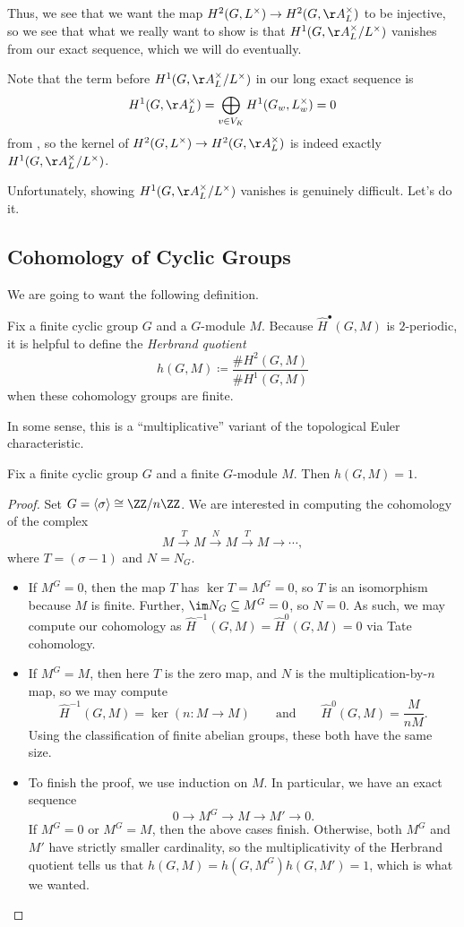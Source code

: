 \documentclass[../notes.tex]{subfiles}
\begin{document}
Thus, we see that we want the map $H^2(G,L^\times)\to H^2(G,\AA_L^\times)$ to be injective, so we see that what we really want to show is that $H^1(G,\AA_L^\times/L^\times)$ vanishes from our exact sequence, which we will do eventually.
\begin{remark}
	Note that the term before $H^1(G,\AA_L^\times/L^\times)$ in our long exact sequence is
	\[H^1(G,\AA_L^\times)=\bigoplus_{v\in V_K}H^1(G_w,L_w^\times)=0\]
	from , so the kernel of $H^2(G,L^\times)\to H^2(G,\AA_L^\times)$ is indeed exactly $H^1(G,\AA_L^\times/L^\times)$.
\end{remark}
Unfortunately, showing $H^1(G,\AA_L^\times/L^\times)$ vanishes is genuinely difficult. Let's do it.

\subsection{Cohomology of Cyclic Groups}
We are going to want the following definition.
\begin{definition}
	Fix a finite cyclic group $G$ and a $G$-module $M$. Because $\widehat H^\bullet(G,M)$ is $2$-periodic, it is helpful to define the \textit{Herbrand quotient}
	\[h(G,M)\coloneqq\frac{\#H^2(G,M)}{\#H^1(G,M)}\]
	when these cohomology groups are finite.
\end{definition}
\begin{remark}
	In some sense, this is a ``multiplicative'' variant of the topological Euler characteristic.
\end{remark}
\begin{lemma}
	Fix a finite cyclic group $G$ and a finite $G$-module $M$. Then $h(G,M)=1$.
\end{lemma}
\begin{proof}
	Set $G=\langle\sigma\rangle\cong\ZZ/n\ZZ$. We are interested in computing the cohomology of the complex
	\[M\xrightarrow{T}M\xrightarrow{N}M\xrightarrow{T}M\to\cdots,\]
	where $T=(\sigma-1)$ and $N=N_G$.
	\begin{itemize}
		\item If $M^G=0$, then the map $T$ has $\ker T=M^G=0$, so $T$ is an isomorphism because $M$ is finite. Further, $\im N_G\subseteq M^G=0$, so $N=0$. As such, we may compute our cohomology as $\widehat H^{-1}(G,M)=\widehat H^0(G,M)=0$ via Tate cohomology.
		\item If $M^G=M$, then here $T$ is the zero map, and $N$ is the multiplication-by-$n$ map, so we may compute
		\[\widehat H^{-1}(G,M)=\ker(n\colon M\to M)\qquad\text{and}\qquad\widehat H^0(G,M)=\frac{M}{nM}.\]
		Using the classification of finite abelian groups, these both have the same size.
		\item To finish the proof, we use induction on $M$. In particular, we have an exact sequence
		\[0\to M^G\to M\to M'\to0.\]
		If $M^G=0$ or $M^G=M$, then the above cases finish. Otherwise, both $M^G$ and $M'$ have strictly smaller cardinality, so the multiplicativity of the Herbrand quotient tells us that $h(G,M)=h(G,M^G)h(G,M')=1$, which is what we wanted.
		\qedhere
	\end{itemize}
\end{proof}
\end{document}
